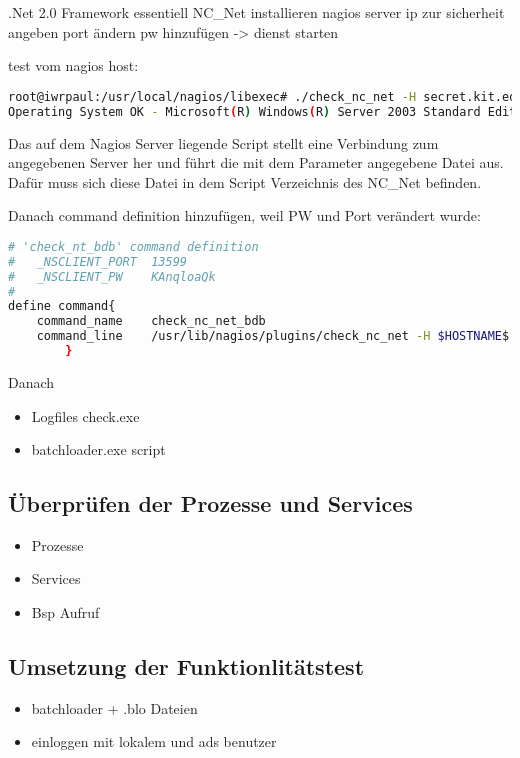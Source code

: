 .Net 2.0 Framework essentiell
NC\_Net installieren
nagios server ip zur sicherheit angeben
port ändern
pw hinzufügen
-> dienst starten

test vom nagios host:

\begin{lstlisting}[captionpos=b, caption=Aufruf eines aktiven Checks, label=activecheckexample, breaklines = true, language=bash]
root@iwrpaul:/usr/local/nagios/libexec# ./check_nc_net -H secret.kit.edu -p 123456 -s secret -v RUNSCRIPT -l check_uname.exe
Operating System OK - Microsoft(R) Windows(R) Server 2003 Standard Edition Service Pack 2
\end{lstlisting}

Das auf dem Nagios Server liegende Script  stellt eine Verbindung zum angegebenen Server her und führt die mit dem Parameter  angegebene Datei aus. Dafür muss sich diese Datei in dem Script Verzeichnis des NC\_Net befinden.


Danach command definition hinzufügen, weil PW und Port verändert wurde:
\begin{lstlisting}[captionpos=b, caption=Nagios-Befehls Definition für den Host, label=activecheckexample, breaklines = true, language=bash]
# 'check_nt_bdb' command definition
#	_NSCLIENT_PORT	13599
#	_NSCLIENT_PW	KAnqloaQk
#
define command{
    command_name    check_nc_net_bdb
	command_line 	/usr/lib/nagios/plugins/check_nc_net -H $HOSTNAME$ -p 13599 -s KAnqloaQk -v $ARG1$
        }
\end{lstlisting}

Danach
\begin{itemize}
\item Logfiles check.exe 
\item batchloader.exe script
\end{itemize}


\subsection{Überprüfen der Prozesse und Services}
\begin{itemize}
\item Prozesse
\item Services
\item Bsp Aufruf
\end{itemize}

\subsection{Umsetzung der Funktionlitätstest}
\begin{itemize}
\item batchloader + .blo Dateien
\item einloggen mit lokalem und ads benutzer
\end{itemize}

